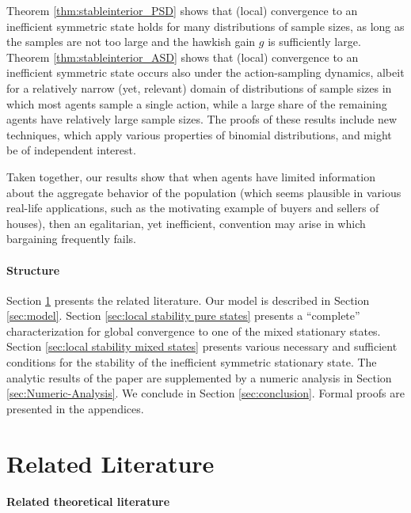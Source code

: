 \documentclass[12pt]{article}
\numberwithin{equation}{section}
\numberwithin{figure}{section}
\theoremstyle{definition}
\theoremstyle{plain}
\theoremstyle{plain}
\theoremstyle{plain}
\theoremstyle{remark}
\theoremstyle{plain}
\theoremstyle{plain}
\begin{document}
Theorem \ref{thm:stableinterior_PSD} shows that (local) convergence to an inefficient symmetric state holds for many distributions of sample sizes, as long as the samples are not too large
and the hawkish gain $g$ is sufficiently large. Theorem \ref{thm:stableinterior_ASD} shows that (local) convergence to an inefficient symmetric state occurs also under the action-sampling dynamics, albeit for a relatively narrow (yet, relevant) domain of distributions of sample sizes in which most agents sample a single action, while a large share  of the remaining agents have relatively large sample sizes. 
The proofs of these results include 
new techniques, which apply various properties of binomial distributions, and might be of independent interest.

Taken together, our results show that when agents have limited information about the aggregate behavior of the population (which seems plausible in various real-life applications, such as the motivating example of buyers and sellers of houses), then an egalitarian, yet inefficient, convention may arise in which bargaining frequently fails. 

\paragraph{Structure} 
Section \ref{related-literature} presents the related literature. Our model is described in Section \ref{sec:model}. Section \ref{sec:local stability pure states} presents a ``complete'' characterization for global convergence to one of the mixed stationary states. Section \ref{sec:local stability mixed states} presents various necessary and sufficient conditions for the  stability of the inefficient symmetric stationary state.
The analytic results of the paper are supplemented by a numeric analysis in Section \ref{sec:Numeric-Analysis}.
We conclude in Section \ref{sec:conclusion}. Formal proofs are presented in the appendices.

\section{Related Literature}\label{related-literature}
\paragraph{Related theoretical literature}
\end{document}
